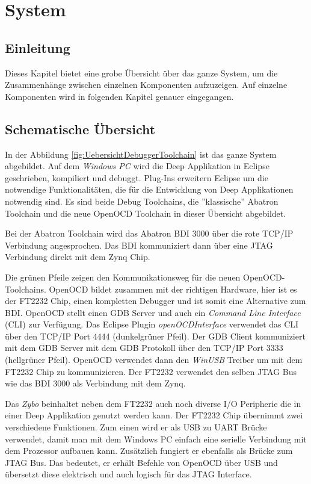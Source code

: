 \chapter{System}
\section{Einleitung}
Dieses Kapitel bietet eine grobe Übersicht über das ganze System, um die Zusammenhänge zwischen einzelnen Komponenten aufzuzeigen.
Auf einzelne Komponenten wird in folgenden Kapitel genauer eingegangen.

\section{Schematische Übersicht}
In der Abbildung \ref{fig:UebersichtDebuggerToolchain} ist das ganze System abgebildet.
Auf dem \textit{Windows PC} wird die Deep Applikation in Eclipse geschrieben, kompiliert und debuggt.
Plug-Ins erweitern Eclipse um die notwendige Funktionalitäten, die für die Entwicklung von Deep Applikationen notwendig sind.
Es sind beide Debug Toolchains, die ''klassische'' Abatron Toolchain und die neue OpenOCD Toolchain in dieser Übersicht abgebildet.

Bei der Abatron Toolchain wird das Abatron BDI 3000 über die rote TCP/IP Verbindung angesprochen.
Das BDI kommuniziert dann über eine JTAG Verbindung direkt mit dem Zynq Chip.

Die grünen Pfeile zeigen den Kommunikationsweg für die neuen OpenOCD-Toolchains.
OpenOCD bildet zusammen mit der richtigen Hardware, hier ist es der FT2232 Chip, einen kompletten Debugger und ist somit eine Alternative zum BDI.
OpenOCD stellt einen GDB Server und auch ein \textit{Command Line Interface} (CLI) zur Verfügung.
Das Eclipse Plugin \textit{openOCDInterface} verwendet das CLI über den TCP/IP Port 4444 (dunkelgrüner Pfeil).
Der GDB Client kommuniziert mit dem GDB Server mit dem GDB Protokoll über den TCP/IP Port 3333 (hellgrüner Pfeil).
OpenOCD verwendet dann den \textit{WinUSB} Treiber um mit dem FT2232 Chip zu kommunizieren.
Der FT2232 verwendet den selben JTAG Bus wie das BDI 3000 als Verbindung mit dem Zynq.

Das \textit{Zybo} beinhaltet neben dem FT2232 auch noch diverse I/O Peripherie die in einer Deep Applikation genutzt werden kann.
Der FT2232 Chip übernimmt zwei verschiedene Funktionen.
Zum einen wird er als USB zu UART Brücke verwendet, damit man mit dem Windows PC einfach eine serielle Verbindung mit dem Prozessor aufbauen kann.
Zusätzlich fungiert er ebenfalls als Brücke zum JTAG Bus.
Das bedeutet, er erhält Befehle von OpenOCD über USB und übersetzt diese elektrisch und auch logisch für das JTAG Interface.

